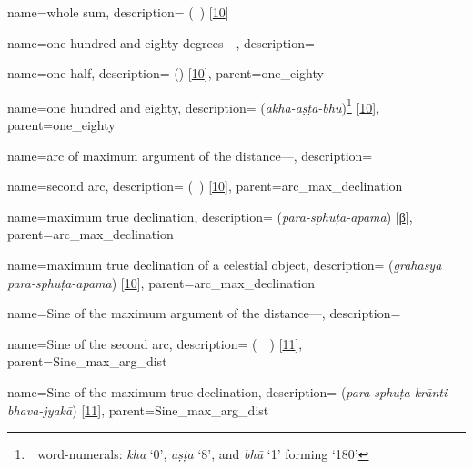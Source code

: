 {
        name={whole sum},
        description={ (\tamam\idafaconsonant\ \majmu) [\hyperlink{PEpass10}{10}]}
}

{
        name={one hundred and eighty degrees---},
        description={\phantom{x}\nopagebreak}
}

{
        name={one-half},
        description={ (\nisf) [\hyperlink{PEpass10}{10}]},
        parent={one_eighty}
}

{
        name={one hundred and eighty},
        description={ (\textit{akha-aṣṭa-bhū})\footnote{\,\bhutasamkhya\ word-numerals: \textit{kha} `0', \textit{aṣṭa} `8', and  \textit{bhū} `1' forming `180'} [\hyperlink{SEpass10}{10}]},
        parent={one_eighty}
}

{
        name={arc of maximum argument of the distance---},
        description={\phantom{x}\nopagebreak}
}

{
        name={second arc},
        description={ (\qaws\idafaconsonant\ \duvum) [\hyperlink{PEpass10}{10}]},
        parent={arc_max_declination}
}

{
        name={maximum true declination},
        description={ (\textit{para-sphuṭa-apama}) [\hyperlink{SEpassB}{β}]},
        parent={arc_max_declination}
}    

{
        name={maximum true declination of a celestial object},
        description={\newline{} (\textit{grahasya para-sphuṭa-apama}) [\hyperlink{SEpass10}{10}]},
        parent={arc_max_declination}
}        

{
        name={Sine of the maximum argument of the distance---},
        description={\phantom{x}\nopagebreak}
}

{
        name={Sine of the second arc},
        description={ (\jayb\idafaconsonant\ \qaws\idafaconsonant\ \duvum) [\hyperlink{PEpass11}{11}]},
        parent={Sine_max_arg_dist}
}

{
        name={Sine of the maximum true declination},
        description={ (\textit{para-sphuṭa-krānti-bhava-jyakā}) [\hyperlink{SEpass11}{11}]},
        parent={Sine_max_arg_dist}
}        


